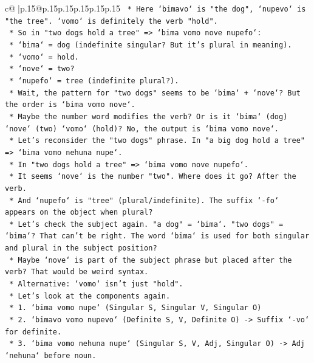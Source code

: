 \documentclass{article}
\begin{document}
{\begin{supertabular}{c@{$\;$}|p{.15\linewidth}@{}p{.15\linewidth}p{.15\linewidth}p{.15\linewidth}p{.15\linewidth}p{.15\linewidth}}
{{{\texttt{        *   Here `bimavo` is "the dog", `nupevo` is "the tree". `vomo` is definitely the verb "hold".} \\
\texttt{        *   So in "two dogs hold a tree" => `bima vomo nove nupefo`:} \\
\texttt{            *   `bima` = dog (indefinite singular? But it's plural in meaning).} \\
\texttt{            *   `vomo` = hold.} \\
\texttt{            *   `nove` = two?} \\
\texttt{            *   `nupefo` = tree (indefinite plural?).} \\
\texttt{        *   Wait, the pattern for "two dogs" seems to be `bima` + `nove`? But the order is `bima vomo nove`.} \\
\texttt{        *   Maybe the number word modifies the verb? Or is it `bima` (dog) `nove` (two) `vomo` (hold)? No, the output is `bima vomo nove`.} \\
\texttt{        *   Let's reconsider the "two dogs" phrase. In "a big dog hold a tree" => `bima vomo nehuna nupe`.} \\
\texttt{        *   In "two dogs hold a tree" => `bima vomo nove nupefo`.} \\
\texttt{        *   It seems `nove` is the number "two". Where does it go? After the verb.} \\
\texttt{        *   And `nupefo` is "tree" (plural/indefinite). The suffix `{-}fo` appears on the object when plural?} \\
\texttt{        *   Let's check the subject again. "a dog" = `bima`. "two dogs" = `bima`? That can't be right. The word `bima` is used for both singular and plural in the subject position?} \\
\texttt{        *   Maybe `nove` is part of the subject phrase but placed after the verb? That would be weird syntax.} \\
\texttt{        *   Alternative: `vomo` isn't just "hold".} \\
\texttt{        *   Let's look at the components again.} \\
\texttt{        *   1. `bima vomo nupe` (Singular S, Singular V, Singular O)} \\
\texttt{        *   2. `bimavo vomo nupevo` (Definite S, V, Definite O) {-}> Suffix `{-}vo` for definite.} \\
\texttt{        *   3. `bima vomo nehuna nupe` (Singular S, V, Adj, Singular O) {-}> Adj `nehuna` before noun.} \\
}}}
\end{supertabular}}
\end{document}
